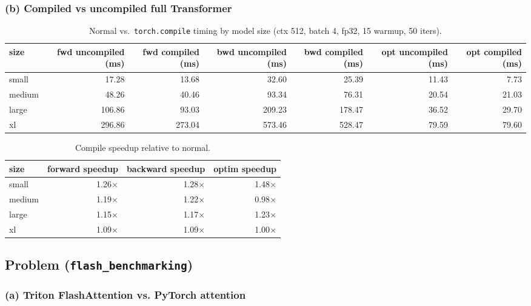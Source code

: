 \documentclass[11pt]{article}
\begin{document}
\subsubsection*{(b) Compiled vs uncompiled full Transformer}

\begin{table}[H]
\centering
\small
\caption{Normal vs.\ \texttt{torch.compile} timing by model size (ctx 512, batch 4, fp32, 15 warmup, 50 iters).}
\setlength{\tabcolsep}{4pt}
\begin{tabular}{lrrrrrr}
\toprule
size & fwd uncompiled (ms) & fwd compiled (ms) & bwd uncompiled (ms) & bwd compiled (ms) & opt uncompiled (ms) & opt compiled (ms) \\
\midrule
small  &  17.28 &  13.68 &  32.60 &  25.39 & 11.43 &  7.73 \\
medium &  48.26 &  40.46 &  93.34 &  76.31 & 20.54 & 21.03 \\
large  & 106.86 &  93.03 & 209.23 & 178.47 & 36.52 & 29.70 \\
xl     & 296.86 & 273.04 & 573.46 & 528.47 & 79.59 & 79.60 \\
\bottomrule
\end{tabular}
\end{table}

\begin{table}[H]
\centering
\caption{Compile speedup relative to normal.}
\begin{tabular}{lrrr}
\toprule
size & forward speedup & backward speedup & optim speedup \\
\midrule
small  & 1.26$\times$ & 1.28$\times$ & 1.48$\times$ \\
medium & 1.19$\times$ & 1.22$\times$ & 0.98$\times$ \\
large  & 1.15$\times$ & 1.17$\times$ & 1.23$\times$ \\
xl     & 1.09$\times$ & 1.09$\times$ & 1.00$\times$ \\
\bottomrule
\end{tabular}
\end{table}

\vspace{4em}


\subsection{Problem (\texttt{flash\_benchmarking})}

\subsubsection*{(a) Triton FlashAttention vs. PyTorch attention}
\end{document}

